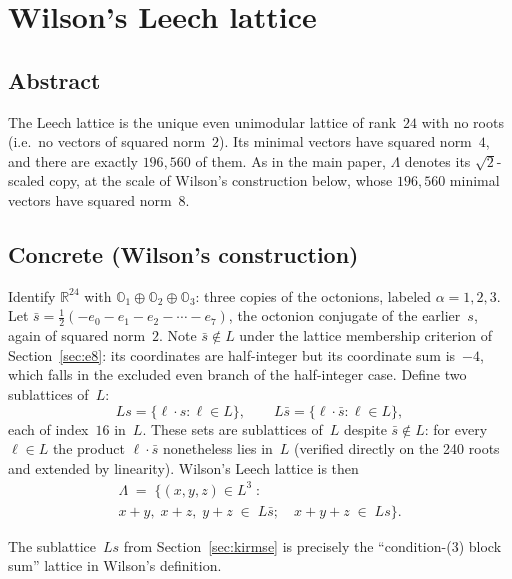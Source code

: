 \documentclass[11pt]{amsart}
\newcommand{\LL}{\Lambda}
\newcommand{\OO}{\mathbb{O}}
\newcommand{\RR}{\mathbb{R}}
\begin{document}
\section{Wilson's Leech lattice}\label{sec:wilson-leech}

\subsection*{Abstract}

The Leech lattice is the unique even unimodular lattice of
rank~$24$ with no roots (i.e.\ no vectors of squared norm~$2$).  Its
minimal vectors have squared norm~$4$, and there are exactly
$196{,}560$ of them.  As in the main paper, $\LL$ denotes its
$\sqrt{2}$-scaled copy, at the scale of Wilson's construction below,
whose $196{,}560$ minimal vectors have squared norm~$8$.

\subsection*{Concrete (Wilson's construction)}

Identify $\RR^{24}$ with $\OO_1 \oplus \OO_2 \oplus \OO_3$: three
copies of the octonions, labeled $\alpha = 1, 2, 3$.  Let
$\bar{s} = \tfrac{1}{2}(-e_0 - e_1 - e_2 - \cdots - e_7)$, the
octonion conjugate of the earlier~$s$, again of
squared norm~$2$.  Note $\bar s \notin L$ under the lattice
membership criterion of Section~\ref{sec:e8}: its coordinates are
half-integer but its coordinate sum is~$-4$, which falls in the
excluded even branch of the half-integer case.  Define two
sublattices of~$L$:
\[
  Ls = \{\ell \cdot s : \ell \in L\}, \qquad
  L\bar{s} = \{\ell \cdot \bar{s} : \ell \in L\},
\]
each of index~$16$ in~$L$.  These sets are sublattices of~$L$
despite $\bar s \notin L$: for every $\ell \in L$ the product
$\ell \cdot \bar s$ nonetheless lies in~$L$ (verified directly on
the 240 roots and extended by linearity).  Wilson's Leech lattice is then
\begin{multline}\label{eq:leech}
  \LL \;=\; \bigl\{(x, y, z) \in L^3 \;:\\
    x + y,\; x + z,\; y + z \;\in\; L\bar{s}; \quad
    x + y + z \;\in\; Ls \bigr\}.
\end{multline}

The sublattice~$Ls$ from Section~\ref{sec:kirmse} is precisely the
``condition-(3) block sum'' lattice in Wilson's definition.
\end{document}
